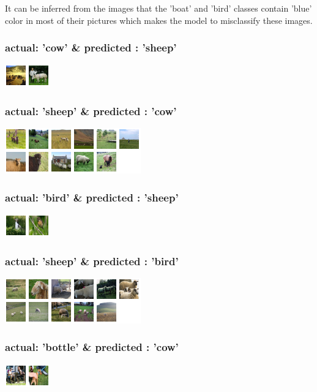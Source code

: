\documentclass[fleqn]{article}
\begin{document}
It can be inferred from the images that the 'boat' and 'bird' classes contain 'blue' color in most of their pictures which makes the model to misclassify these images.\\

\subsubsection{actual: 'cow' \& predicted : 'sheep'}
\includegraphics[scale=1.5]{./pics/miscallssify_cow_to_sheep.png}\\

\subsubsection{actual: 'sheep' \& predicted : 'cow'}
\includegraphics[scale=1.5]{./pics/miscallssify_sheep_to_cow.png}\\

\subsubsection{actual: 'bird' \& predicted : 'sheep'}
\includegraphics[scale=1.5]{./pics/miscallssify_bird_to_sheep.png}\\

\subsubsection{actual: 'sheep' \& predicted : 'bird'}
\includegraphics[scale=1.5]{./pics/miscallssify_sheep_to_bird.png}\\

\subsubsection{actual: 'bottle' \& predicted : 'cow'}
\includegraphics[scale=1.5]{./pics/miscallssify_bottle_to_cow.png}\\
\end{document}
